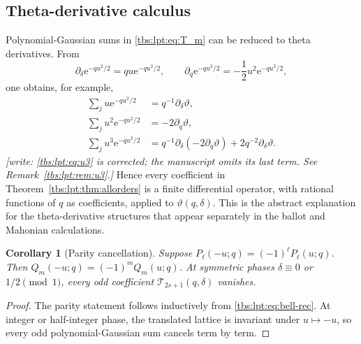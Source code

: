 \documentclass[11pt,a4paper]{article}
\numberwithin{equation}{section}
\newtheorem{corollary}[theorem]{Corollary}
\theoremstyle{definition}
\newcommand{\ee}{\mathrm e}
\begin{document}
\subsection{Theta-derivative calculus}\label{tbs:lpt:sec:theta-calculus}
Polynomial-Gaussian sums in \eqref{tbs:lpt:eq:T_m} can be reduced to theta
derivatives. From
\[
 \partial_\delta\ee^{-qu^2/2}=qu\ee^{-qu^2/2},\qquad
 \partial_q\ee^{-qu^2/2}=-\frac12u^2\ee^{-qu^2/2},
\]
one obtains, for example,
\begin{align}
 \sum_j u\ee^{-qu^2/2}&=q^{-1}\partial_\delta\vartheta,\label{tbs:lpt:eq:u1}\\
 \sum_j u^2\ee^{-qu^2/2}&=-2\partial_q\vartheta,\label{tbs:lpt:eq:u2}\\
 \sum_j u^3\ee^{-qu^2/2}&=q^{-1}\partial_\delta(-2\partial_q\vartheta)
 +2q^{-2}\partial_\delta\vartheta.\label{tbs:lpt:eq:u3}
\end{align}
\emph{[write: \eqref{tbs:lpt:eq:u3} is corrected; the manuscript omits its
last term. See Remark~\ref{tbs:lpt:rem:u3}.]} Hence every coefficient in
Theorem~\ref{tbs:lpt:thm:allorders} is a finite differential operator,
with rational functions of $q$ as coefficients, applied to
$\vartheta(q,\delta)$. This is the abstract explanation for the
theta-derivative structures that appear separately in the ballot and
Mahonian calculations.

\begin{corollary}[Parity cancellation]\label{tbs:lpt:cor:parity}
Suppose $P_\ell(-u;q)=(-1)^\ell P_\ell(u;q)$. Then
$Q_m(-u;q)=(-1)^mQ_m(u;q)$. At symmetric phases $\delta\equiv0$ or
$1/2\pmod1$, every odd coefficient $\mathcal T_{2s+1}(q,\delta)$ vanishes.
\end{corollary}

\begin{proof}
The parity statement follows inductively from \eqref{tbs:lpt:eq:bell-rec}.
At integer or half-integer phase, the translated lattice is invariant
under $u\mapsto-u$, so every odd polynomial-Gaussian sum cancels term by
term.
\end{proof}
\end{document}

